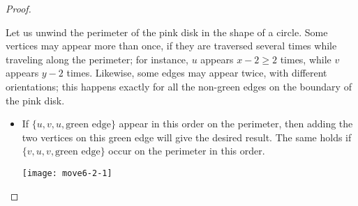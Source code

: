 \documentclass{article}
\begin{document}
\begin{proof}
\begin{manycases}
Let us unwind the perimeter of the pink disk in the shape of a circle. Some vertices may appear more than once, if they are traversed several times while traveling along the perimeter; for instance, $u$ appears $x-2\ge 2$ times, while $v$ appears $y-2$ times. Likewise, some edges may appear twice, with different orientations; this happens exactly for all the non-green edges on the boundary of the pink disk.
\begin{itemize}
\setlength{\columnsep}{0em}
\item If $\{u,v,u,\text{green edge}\}$ appear in this order on the perimeter, then adding the two vertices on this green edge will give the desired result. The same holds if $\{v,u,v,\text{green edge}\}$ occur on the perimeter in this order.

\begin{center}\texttt{[image: move6-2-1]}\end{center}


\end{itemize}
\end{manycases}
\end{proof}
\end{document}

